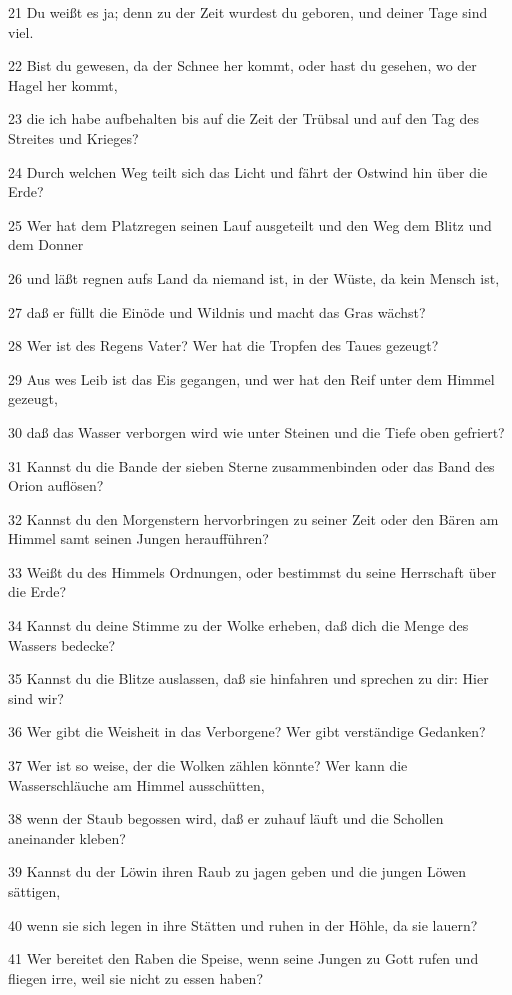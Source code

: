 \par 21 Du weißt es ja; denn zu der Zeit wurdest du geboren, und deiner Tage sind viel.
\par 22 Bist du gewesen, da der Schnee her kommt, oder hast du gesehen, wo der Hagel her kommt,
\par 23 die ich habe aufbehalten bis auf die Zeit der Trübsal und auf den Tag des Streites und Krieges?
\par 24 Durch welchen Weg teilt sich das Licht und fährt der Ostwind hin über die Erde?
\par 25 Wer hat dem Platzregen seinen Lauf ausgeteilt und den Weg dem Blitz und dem Donner
\par 26 und läßt regnen aufs Land da niemand ist, in der Wüste, da kein Mensch ist,
\par 27 daß er füllt die Einöde und Wildnis und macht das Gras wächst?
\par 28 Wer ist des Regens Vater? Wer hat die Tropfen des Taues gezeugt?
\par 29 Aus wes Leib ist das Eis gegangen, und wer hat den Reif unter dem Himmel gezeugt,
\par 30 daß das Wasser verborgen wird wie unter Steinen und die Tiefe oben gefriert?
\par 31 Kannst du die Bande der sieben Sterne zusammenbinden oder das Band des Orion auflösen?
\par 32 Kannst du den Morgenstern hervorbringen zu seiner Zeit oder den Bären am Himmel samt seinen Jungen heraufführen?
\par 33 Weißt du des Himmels Ordnungen, oder bestimmst du seine Herrschaft über die Erde?
\par 34 Kannst du deine Stimme zu der Wolke erheben, daß dich die Menge des Wassers bedecke?
\par 35 Kannst du die Blitze auslassen, daß sie hinfahren und sprechen zu dir: Hier sind wir?
\par 36 Wer gibt die Weisheit in das Verborgene? Wer gibt verständige Gedanken?
\par 37 Wer ist so weise, der die Wolken zählen könnte? Wer kann die Wasserschläuche am Himmel ausschütten,
\par 38 wenn der Staub begossen wird, daß er zuhauf läuft und die Schollen aneinander kleben?
\par 39 Kannst du der Löwin ihren Raub zu jagen geben und die jungen Löwen sättigen,
\par 40 wenn sie sich legen in ihre Stätten und ruhen in der Höhle, da sie lauern?
\par 41 Wer bereitet den Raben die Speise, wenn seine Jungen zu Gott rufen und fliegen irre, weil sie nicht zu essen haben?


